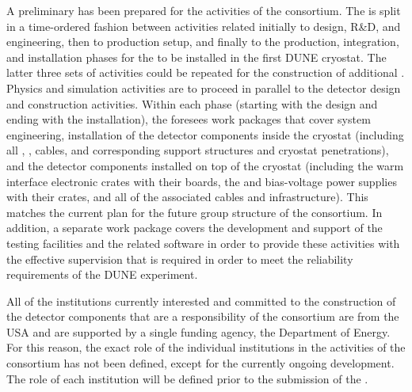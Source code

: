 A preliminary  has been prepared for the activities
of the  consortium. The  is split in a time-ordered fashion
between activities related initially to design, R\&D, and engineering, then
to production setup, and finally to the production, integration, and installation
phases for the  to be installed in the first DUNE cryostat.
The latter three sets of activities could be repeated for the construction
of additional .  %
Physics and simulation
activities are to proceed in parallel to the detector design and construction activities.
Within each phase (starting with the design and ending with the installation),
the  foresees work packages that cover system engineering, installation of the detector
components inside the cryostat (including all , ,
cables, and corresponding support structures and cryostat penetrations),
and the detector components installed on top of the cryostat (including the warm
interface electronic crates with their boards, the  and bias-voltage
power supplies with their crates, and all of the associated cables and infrastructure). This
matches the current plan for the future group structure of the  consortium. 
In addition, a separate work package covers the development and support of the testing facilities and the related software in order to provide these activities with the effective supervision that is required in order to meet the reliability requirements of the DUNE experiment.

All of the institutions currently interested and committed to the construction of
the detector components that are a responsibility of the 
consortium are from the USA and are supported by a single
funding agency, the Department of Energy. For this reason, the exact role of
the individual institutions in the activities of the consortium has not been
defined, except for the currently ongoing  development. The role of
each institution will be defined prior to the submission of the .
